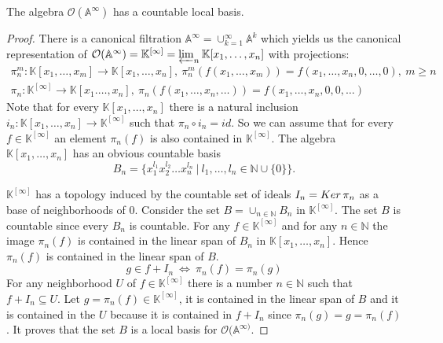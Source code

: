 \documentclass[10pt,a4paper]{amsart}
\def\BA{{\mathbb A}}
\def\BK{{\mathbb K}}
\def\BN{{\mathbb N}}
\def\CO{\mathcal{O}}
\def\Ker{{\rm Ker}\,}
\begin{document}
\begin{proposition}\label{space}
    The algebra $\CO(\BA^{\infty})$ has a countable local basis.
\end{proposition}

\begin{proof}
    There is a canonical filtration $\BA^\infty = \cup_{k=1}^\infty \BA^k$ which yields us the canonical representation of $\mathcal{O}(\BA^\infty) = \BK^{[\infty]} = \varprojlim_{n}\BK[x_1, \dotsc, x_n]$ with projections:\begin{gather*}
        \pi_n^m:\BK[x_1,\dotsc,x_m] \to \BK[x_1, \dotsc,x_{n}], \ \pi_n^m(f(x_1, \dotsc,x_m)) = f(x_1,\dotsc,x_{n}, 0, \dotsc, 0), \ m \geq n\\
        \pi_n: \BK^{[\infty]} \to \BK[x_1.\dotsc,x_n], \ \pi_n(f(x_1, \dotsc, x_n, \dotsc)) = f(x_1,\dotsc,x_n,0,0,\dotsc)
    \end{gather*}
    Note that for every $\BK[x_1,\dotsc,x_n]$ there is a natural inclusion $i_n: \BK[x_1,\dotsc,x_n] \to \BK^{[\infty]}$ such that $\pi_n \circ i_n = id$. So we can assume that for every $f \in \BK^{[\infty]}$ an element $\pi_n(f)$ is also contained in $\BK^{[\infty]}$. The algebra $\BK[x_1,\dotsc,x_n]$ has an obvious countable basis \begin{equation*}
        B_n = \{x_1^{l_1}x_2^{l_2}\dotsc x_n^{l_n} \ | \ l_1,\dotsc,l_n \in \BN\cup\{0\}\}. 
    \end{equation*}
    
    
    $\BK^{[\infty]}$ has a topology induced by the countable set of ideals $I_n = \Ker \pi_n$ as a base of neighborhoods of 0. Consider the set $B = \cup_{n\in\BN}B_n$ in $\BK^{[\infty]}$. The set $B$ is countable since every $B_n$ is countable. For any $f \in \BK^{[\infty]}$ and for any $n \in \BN$ the image $\pi_n(f)$ is contained in the linear span of $B_n$ in $\BK[x_1,\dotsc,x_n]$. Hence $\pi_n(f)$ is contained in the linear span of $B$. \begin{equation*}
        g \in f + I_n  \ \Leftrightarrow \ \pi_n(f) = \pi_n(g)
    \end{equation*}
    For any neighborhood $U$ of $f \in \BK^{[\infty]}$ there is a number $n \in \BN$ such that $f + I_n \subseteq U$. Let $g = \pi_n(f) \in \BK^{[\infty]}$, it is contained in the linear span of $B$ and it is contained in the $U$ because it is contained in $f + I_n$ since $\pi_n(g) = g = \pi_n(f)$. It proves that the set $B$ is a local basis for $\mathcal{O}(\BA^{\infty)}$.

\end{proof}
\end{document}
